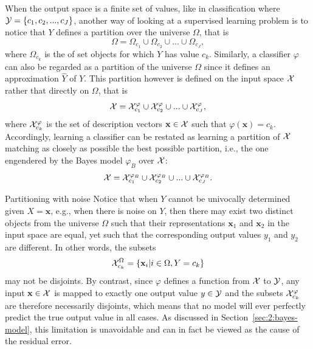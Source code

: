 When the output space is a finite set of values, like in classification where
${\cal Y} = \{c_1, c_2, ..., c_J\}$, another way of looking at a supervised
learning problem is to notice that $Y$ defines a partition over the universe
$\Omega$, that is
\begin{equation}
\Omega = \Omega_{c_1} \cup \Omega_{c_2} \cup \dots \cup \Omega_{c_J},
\end{equation}
where $\Omega_{c_k}$ is the of set objects for which $Y$ has value $c_k$.
Similarly, a classifier $\varphi$ can also be regarded as a partition of the
universe $\Omega$ since it defines an approximation $\widehat{Y}$ of $Y$.
This partition however is defined on the input space ${\cal X}$ rather
that directly on $\Omega$, that is
\begin{equation}\label{eqn:3:partition}
{\cal X} = {\cal X}^\varphi_{c_1} \cup {\cal X}^\varphi_{c_2} \cup ... \cup {\cal X}^\varphi_{c_J},
\end{equation}
where
${\cal X}^\varphi_{c_k}$ is the set of description vectors $\mathbf{x} \in {\cal X}$ such that
$\varphi(\mathbf{x}) = c_k$. Accordingly, learning a classifier can
be restated as learning a partition of ${\cal X}$ matching as closely as
possible the best possible partition, i.e., the one engendered by the Bayes model $\varphi_B$ over ${\cal X}$:
\begin{equation}\label{eqn:3:partition}
{\cal X} = {\cal X}^{\varphi_B}_{c_1} \cup {\cal X}^{\varphi_B}_{c_2} \cup ... \cup {\cal X}^{\varphi_B}_{c_J}.
\end{equation}

\begin{remark}{Partitioning with noise}
Notice that when $Y$ cannot be univocally determined given $X=\mathbf{x}$,
e.g., when there is noise on $Y$, then there may exist two distinct objects from the universe $\Omega$ such
that their representations $\mathbf{x}_1$ and $\mathbf{x}_2$ in the input space
are equal, yet such that the corresponding output values $y_1$ and $y_2$ are different.
In other words, the subsets
\begin{equation}
{\cal X}^\Omega_{c_k} = \{ \mathbf{x}_i | i \in \Omega, Y=c_k \}
\end{equation}
may not be disjoints.
By contrast, since $\varphi$ defines a function from ${\cal X}$ to ${\cal Y}$,
any input $\mathbf{x} \in {\cal X}$ is mapped to exactly one output value $y \in
{\cal Y}$ and the subsets ${\cal X}^\varphi_{c_k}$ are therefore necessarily
disjoints, which means that no model will ever perfectly predict the true output
value in all cases. As discussed in Section~\ref{sec:2:bayes-model}, this
limitation is unavoidable and can in fact be viewed as the cause of the residual error.
\end{remark}

